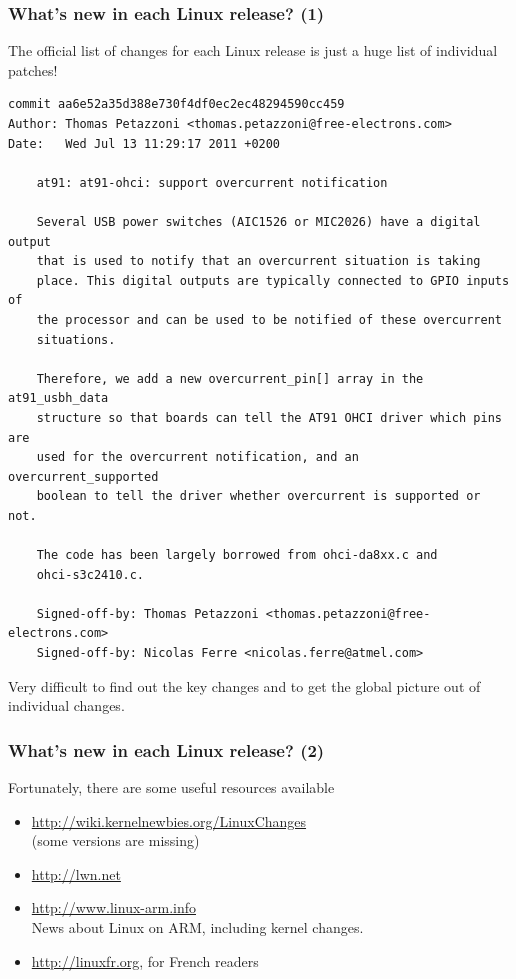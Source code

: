 \begin{frame}[fragile]
  \frametitle{What's new in each Linux release? (1)}
  The official list of changes for each Linux release is just a
  huge list of individual patches!
\Tiny
    \begin{verbatim}
commit aa6e52a35d388e730f4df0ec2ec48294590cc459
Author: Thomas Petazzoni <thomas.petazzoni@free-electrons.com>
Date:   Wed Jul 13 11:29:17 2011 +0200

    at91: at91-ohci: support overcurrent notification

    Several USB power switches (AIC1526 or MIC2026) have a digital output
    that is used to notify that an overcurrent situation is taking
    place. This digital outputs are typically connected to GPIO inputs of
    the processor and can be used to be notified of these overcurrent
    situations.

    Therefore, we add a new overcurrent_pin[] array in the at91_usbh_data
    structure so that boards can tell the AT91 OHCI driver which pins are
    used for the overcurrent notification, and an overcurrent_supported
    boolean to tell the driver whether overcurrent is supported or not.

    The code has been largely borrowed from ohci-da8xx.c and
    ohci-s3c2410.c.

    Signed-off-by: Thomas Petazzoni <thomas.petazzoni@free-electrons.com>
    Signed-off-by: Nicolas Ferre <nicolas.ferre@atmel.com>
\end{verbatim}
\normalsize
  Very difficult to find out the key changes and to get the
  global picture out of individual changes.
\end{frame}

\begin{frame}
  \frametitle{What's new in each Linux release? (2)}
  Fortunately, there are some useful resources available
  \begin{itemize}
    \item \url{http://wiki.kernelnewbies.org/LinuxChanges}\\
	(some versions are missing)
    \item \url{http://lwn.net}
    \item \url{http://www.linux-arm.info}\\
	News about Linux on ARM, including kernel changes.
    \item \url{http://linuxfr.org}, for French readers
  \end{itemize}
\end{frame}
